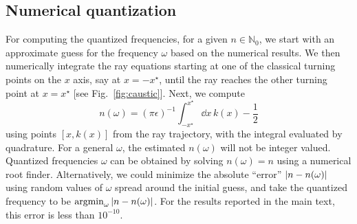 \subsection{Numerical quantization}
\label{app:quantized}

For computing the quantized frequencies, for a given $n \in \mathbb{N}_{0}$, we start with an approximate guess for the frequency $\omega$ based on the numerical results.
We then numerically integrate the ray equations starting at one of the classical turning points on the $x$ axis, say at $x = -x^{\star}$, until the ray reaches the other turning point at $x = x^{\star}$ [see Fig.~\ref{fig:caustic}].
Next, we compute
%
\begin{equation}
  n(\omega) = (\pi\epsilon)^{-1} \int_{-x^{\star}}^{x^{\star}} \dd{x}\,k(x) - \frac{1}{2}
\end{equation}
%
using points $\left[x, k(x)\right]$ from the ray trajectory, with the integral evaluated by quadrature.
For a general $\omega$, the estimated $n(\omega)$ will not be integer valued.
Quantized frequencies $\omega$ can be obtained by solving $n(\omega) = n$ using a numerical root finder.
Alternatively, we could minimize the absolute ``error'' $\lvert n - n(\omega)\rvert$ using random values of $\omega$ spread around the initial guess, and take the quantized frequency to be $\operatorname*{argmin}_{\omega}\,\lvert n - n(\omega)\rvert$.
For the results reported in the main text, this error is less than $10^{-10}$.

